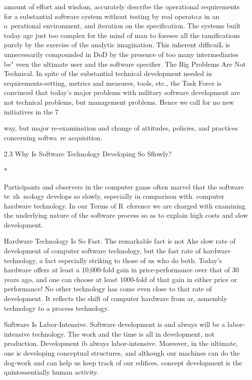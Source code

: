 \documentclass[12pt]{article}
\begin{document}
amount of effort and wisdom, accurately describe the operational requirements for a substantial software system without testing by real operato;s in an o~perational environment,
and iteration on the specification. The systems built today age just too complex for
the mind of man to foresee all the ramifications purely by the exercise of the analytic
imagination.
This inherent difficuiL is unnecessarily compounded in DoD by the presence of too
many intermediaries be" veen the ultimate user and the software specifier.
The Big Problems Are Not Technical. In spite of the substantial technical development needed in requirements-setting, metrics and measures, tools, etc., the Task Force
is convinced that today's major problems with military software development are not
technical problems, but management problems. Hence we call for no new initiatives in the
7

way, but major re-examination and change of attitudes, policies, and practices concerning
softwa~re acquisition.

2.3 Why Is Software Technology Developing So Sflowly?

*

Participants and observers in the computer game often marvel that the software te~zh~no4ogy develops so slowly, especially in comparison with. computer hardware technology.
In our Terms of R~eference we are charged with examining the underlying nature of the
software process so as to explain high costs and slow development.

Hardware Technology Is So Fast.
The remarkable fact is not Ahe slow rate of development of computer software technology, but the fast rate of hardware technology, a fact especially striking to those of us
who do both. Today's hardware offers at least a 10,000-fold gain in price-performance over
that of 30 years ago, and one can choose at least 1000-fold of that gain in either price
or performance! No other technology has come even close to that rate of development.
It reflects the shift of computer hardware from ar, asmembly technology to a process
technology.

Software Is Labor-Intensive.
Software development is and always will be a labor-intensive technology. The work
and the time is all in development, not production. Development ib always labor-intensive.
Moreover, in the ultimate, one is developing conceptual structures, and although our
machines can do the dog-work and can help us keep track of our edifices, concept
development is the quintessentially human activity.
\end{document}
